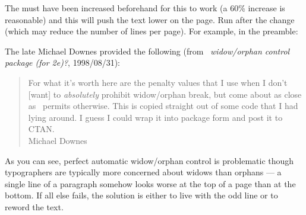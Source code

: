     The \lnc{\topskip} must have been increased beforehand for this to
work (a 60\% increase is reasonable) and this will push the text
lower on the page. Run \cmd{\checkandfixthelayout} after the change (which
may reduce the number of lines per page). For example, in the preamble:
\begin{lcode}
\setlength{\topskip}{1.6\topskip}
\checkandfixthelayout
\sloppybottom
\end{lcode}

    The late Michael Downes provided the following 
(from \ctt\ \textit{widow/orphan control package (for 2e)?}, 1998/08/31):
\begin{quote}
    For what it's worth here are the penalty values that I use when I don't
[want] to \emph{absolutely} prohibit widow/orphan break, but come
about as close as \tx\ permits otherwise. This is copied straight out
of some code that I had lying around. I guess I could wrap it into
package form and post it to CTAN. \\
\hfill Michael Downes
\end{quote}

\begin{lcode}
\end{lcode}

    As you can see, perfect automatic widow/orphan control is problematic 
though typographers are typically more concerned about widows than orphans ---
a single line of a paragraph somehow looks worse at the top of a page than
at the bottom. If all else fails, the solution is either to live with the 
odd line or to reword the text.


